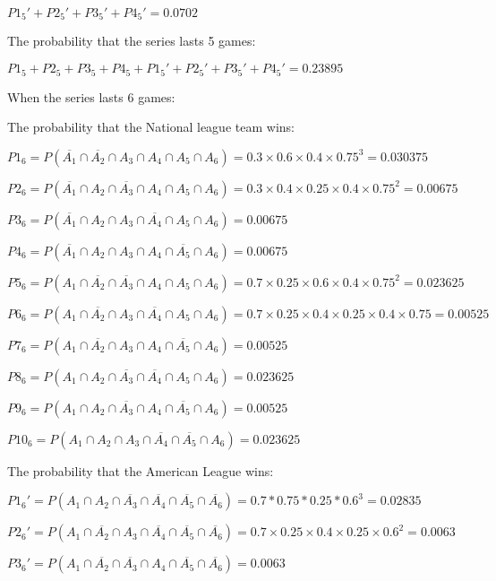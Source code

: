 \documentclass{article}
\begin{document}
	$P1_5'+P2_5'+P3_5'+P4_5'=0.0702$

	The probability that the series lasts 5 games:
	
	$P1_5+P2_5+P3_5+P4_5+P1_5'+P2_5'+P3_5'+P4_5'=0.23895$

	
	\hspace*{\fill}
	
	When the series lasts 6 games:
	
	The probability that the National league team wins:
	
	$P1_6=P(\overline{A_1}\cap \overline{A_2}\cap A_3\cap A_4 \cap A_5\cap A_6)=0.3\times 0.6\times 0.4\times 0.75^3=0.030375$
	
	$P2_6=P(\overline{A_1}\cap A_2\cap \overline{A_3}\cap A_4 \cap A_5\cap A_6)=0.3\times 0.4\times 0.25\times 0.4\times 0.75^2=0.00675$
	
	$P3_6=P(\overline{A_1}\cap A_2\cap A_3\cap \overline{A_4} \cap A_5\cap A_6)=0.00675$
	
	$P4_6=P(\overline{A_1}\cap A_2\cap A_3\cap A_4 \cap \overline{A_5}\cap A_6)=0.00675$
	
	$P5_6=P(A_1\cap \overline{A_2}\cap \overline{A_3}\cap A_4 \cap A_5\cap A_6)=0.7\times 0.25 \times 0.6\times 0.4\times 0.75^2= 0.023625$
	
	$P6_6=P(A_1\cap \overline{A_2}\cap A_3\cap \overline{A_4} \cap A_5\cap A_6)=0.7\times 0.25\times 0.4\times0.25\times 0.4\times 0.75=0.00525$
	
	$P7_6=P(A_1\cap \overline{A_2}\cap A_3\cap A_4 \cap \overline{A_5}\cap A_6)=0.00525$
	
	$P8_6=P(A_1\cap A_2\cap \overline{A_3}\cap \overline{A_4} \cap A_5\cap A_6)=0.023625$
	
	$P9_6=P(A_1\cap A_2\cap \overline{A_3}\cap A_4 \cap \overline{A_5}\cap A_6)=0.00525$
	
	$P10_6=P(A_1\cap A_2\cap A_3\cap \overline{A_4} \cap \overline{A_5}\cap A_6)=0.023625$

		
	The probability that the American League wins:
	
	$P1_6'=P(A_1\cap A_2\cap \overline{A_3}\cap \overline{A_4} \cap \overline{A_5}\cap \overline{A_6})=0.7*0.75*0.25*0.6^3= 0.02835$
	
	$P2_6'=P(A_1\cap \overline{A_2}\cap A_3\cap \overline{A_4} \cap \overline{A_5}\cap \overline{A_6})=0.7\times 0.25\times 0.4\times 0.25\times 0.6^2=0.0063$
	
	$P3_6'=P(A_1\cap \overline{A_2}\cap \overline{A_3}\cap A_4 \cap \overline{A_5}\cap \overline{A_6})=0.0063$
	
\end{document}
